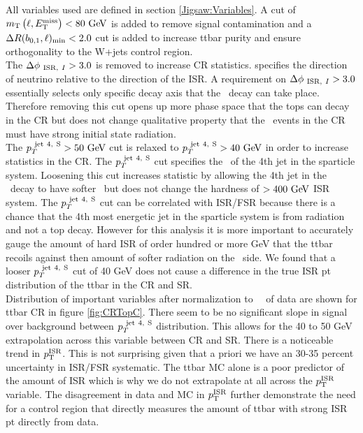 \indent All variables used are defined in section \ref{Jigsaw:Variables}. A cut of $\mtlepmet < 80\gev$ is added to remove signal contamination and a $\Delta R(b_{0,1},\ell)_{\mathrm{min}}<2.0$ cut is added to increase ttbar purity and ensure orthogonality to the W+jets control region. \\
\indent The $\Delta\phi_{~\mathrm{ISR},~I}>3.0$ is removed to increase CR statistics. \dphiISRI specifies the direction of neutrino relative to the direction of the ISR.  A requirement on $\Delta\phi_{~\mathrm{ISR},~I}>3.0$ essentially selects only specific decay axis that the \ttbar\ decay can take place.  Therefore removing this cut opens up more phase space that the tops can decay in the CR but does not change qualitative property that the \ttbar\ events in the CR must have strong initial state radiation. \\
\indent The $\pTjV>50\gev$ cut is relaxed to $\pTjV>40\gev$ in order to increase statistics in the CR.  The $p_{T}^{~\mathrm{jet~4,~S}}$ cut specifies the \pt\ of the 4th jet in the sparticle system.  Loosening this cut increases statistic by allowing the 4th jet in the \ttbar\ decay to have softer \pt\ but does not change the hardness of $>400\gev$ ISR system.  The $p_{T}^{~\mathrm{jet~4,~S}}$ cut can be correlated with ISR/FSR because there is a chance that the 4th most energetic jet in the sparticle system is from radiation and not a top decay.  However for this analysis it is more important to accurately gauge the amount of hard ISR of order hundred or more GeV that the ttbar recoils against then amount of softer radiation on the \ttbar\ side. We found that a looser $p_{T}^{~\mathrm{jet~4,~S}}$ cut of 40 GeV does not cause a difference in the true ISR pt distribution of the ttbar in the CR and SR. \\
\indent Distribution of important variables after normalization to \intlumi\ \ifb\ of data are shown for ttbar CR in figure \ref{fig:CRTopC}.  There seem to be no significant slope in signal over background between $p_{T}^{~\mathrm{jet~4,~S}}$ distribution.  This allows for the 40 to 50 GeV extrapolation across this variable between CR and SR.  There is a noticeable trend in $p_{\mathrm{T}}^{\mathrm{ISR}}$.  This is not surprising given that a priori we have an 30-35 percent uncertainty in ISR/FSR systematic.  The ttbar MC alone is a poor predictor of the amount of ISR which is why we do not extrapolate at all across the $p_{\mathrm{T}}^{\mathrm{ISR}}$ variable.  The disagreement in data and MC in $p_{\mathrm{T}}^{\mathrm{ISR}}$ further demonstrate the need for a control region that directly measures the amount of ttbar with strong ISR pt directly from data. \\

